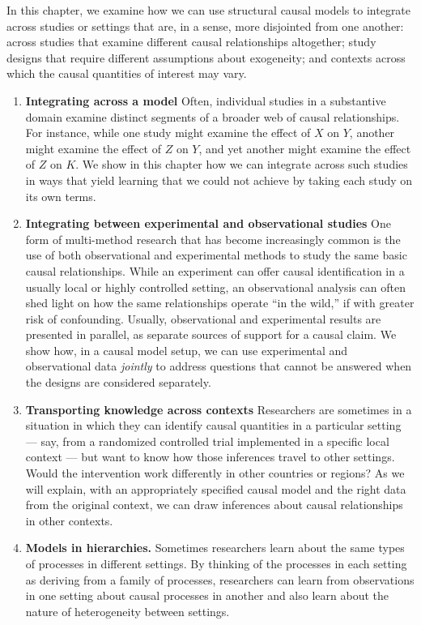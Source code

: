 \documentclass[
  12pt,
]{book}
\begin{document}
In this chapter, we examine how we can use structural causal models to integrate across studies or settings that are, in a sense, more disjointed from one another: across studies that examine different causal relationships altogether; study designs that require different assumptions about exogeneity; and contexts across which the causal quantities of interest may vary.

\begin{enumerate}
\def\labelenumi{\arabic{enumi}.}
\item
  \textbf{Integrating across a model} Often, individual studies in a substantive domain examine distinct segments of a broader web of causal relationships. For instance, while one study might examine the effect of \(X\) on \(Y\), another might examine the effect of \(Z\) on \(Y\), and yet another might examine the effect of \(Z\) on \(K\). We show in this chapter how we can integrate across such studies in ways that yield learning that we could not achieve by taking each study on its own terms.
\item
  \textbf{Integrating between experimental and observational studies} One form of multi-method research that has become increasingly common is the use of both observational and experimental methods to study the same basic causal relationships. While an experiment can offer causal identification in a usually local or highly controlled setting, an observational analysis can often shed light on how the same relationships operate ``in the wild,'' if with greater risk of confounding. Usually, observational and experimental results are presented in parallel, as separate sources of support for a causal claim. We show how, in a causal model setup, we can use experimental and observational data \emph{jointly} to address questions that cannot be answered when the designs are considered separately.
\item
  \textbf{Transporting knowledge across contexts} Researchers are sometimes in a situation in which they can identify causal quantities in a particular setting --- say, from a randomized controlled trial implemented in a specific local context --- but want to know how those inferences travel to other settings. Would the intervention work differently in other countries or regions? As we will explain, with an appropriately specified causal model and the right data from the original context, we can draw inferences about causal relationships in other contexts.
\item
  \textbf{Models in hierarchies.} Sometimes researchers learn about the same types of processes in different settings. By thinking of the processes in each setting as deriving from a family of processes, researchers can learn from observations in one setting about causal processes in another and also learn about the nature of heterogeneity between settings.
\end{enumerate}
\end{document}
